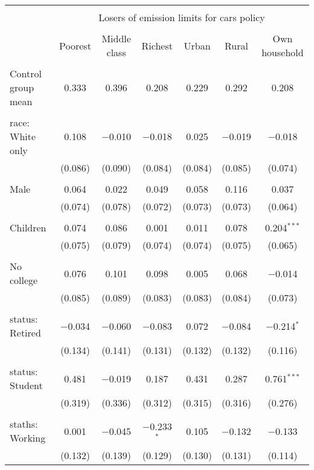 
\begin{tabular}{@{\extracolsep{5pt}}lcccccc} 
\\[-1.8ex]\hline 
\hline \\[-1.8ex] 
 & \multicolumn{6}{c}{Losers of emission limits for cars policy} \\ 
\cline{2-7} 
\\[-1.8ex] & Poorest & Middle class & Richest & Urban & Rural & Own household \\ 
\hline \\[-1.8ex] 
 Control group mean & 0.333 & 0.396 & 0.208 & 0.229 & 0.292 & 0.208  \\ \hline \\[-1.8ex] race: White only & 0.108 & $-$0.010 & $-$0.018 & 0.025 & $-$0.019 & $-$0.018 \\ 
  & (0.086) & (0.090) & (0.084) & (0.084) & (0.085) & (0.074) \\ 
  & & & & & & \\ 
 Male & 0.064 & 0.022 & 0.049 & 0.058 & 0.116 & 0.037 \\ 
  & (0.074) & (0.078) & (0.072) & (0.073) & (0.073) & (0.064) \\ 
  & & & & & & \\ 
 Children & 0.074 & 0.086 & 0.001 & 0.011 & 0.078 & 0.204$^{***}$ \\ 
  & (0.075) & (0.079) & (0.074) & (0.074) & (0.075) & (0.065) \\ 
  & & & & & & \\ 
 No college & 0.076 & 0.101 & 0.098 & 0.005 & 0.068 & $-$0.014 \\ 
  & (0.085) & (0.089) & (0.083) & (0.083) & (0.084) & (0.073) \\ 
  & & & & & & \\ 
 status: Retired & $-$0.034 & $-$0.060 & $-$0.083 & 0.072 & $-$0.084 & $-$0.214$^{*}$ \\ 
  & (0.134) & (0.141) & (0.131) & (0.132) & (0.132) & (0.116) \\ 
  & & & & & & \\ 
 status: Student & 0.481 & $-$0.019 & 0.187 & 0.431 & 0.287 & 0.761$^{***}$ \\ 
  & (0.319) & (0.336) & (0.312) & (0.315) & (0.316) & (0.276) \\ 
  & & & & & & \\ 
 staths: Working & 0.001 & $-$0.045 & $-$0.233$^{*}$ & 0.105 & $-$0.132 & $-$0.133 \\ 
  & (0.132) & (0.139) & (0.129) & (0.130) & (0.131) & (0.114) \\ 

\end{tabular}
